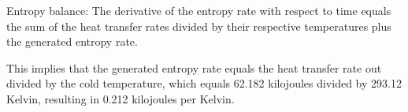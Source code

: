 Entropy balance:
The derivative of the entropy rate with respect to time equals the sum of the heat transfer rates divided by their respective temperatures plus the generated entropy rate.

This implies that the generated entropy rate equals the heat transfer rate out divided by the cold temperature, which equals 62.182 kilojoules divided by 293.12 Kelvin, resulting in 0.212 kilojoules per Kelvin.